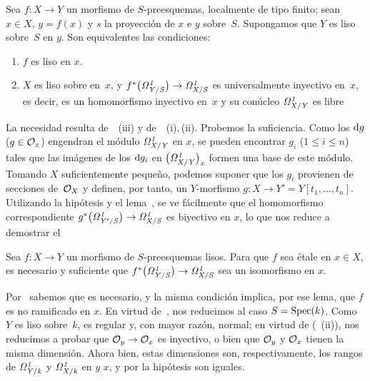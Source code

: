 \begin{corollaire}
\label{II.4.5}
Sea $f\colon X\to Y$ un morfismo de $S$-preesquemas, localmente de tipo finito; sean $x\in X$, $y=f(x)$ y $s$ la proyección de $x$ e $y$ sobre~$S$. Supongamos que $Y$ es liso sobre~$S$ en $y$. Son equivalentes las condiciones:
\begin{enumerate}
\item[(i)] $f$ es liso en $x$.
\item[(ii)] $X$ es liso sobre
en~$x$, y $f^*\big(\it{\Omega}^1_{Y/S}\big)\to\it{\Omega}^1_{X/S}$ es universalmente inyectivo en~$x$, es decir, es un homomorfismo inyectivo en~$x$ y su conúcleo $\it{\Omega}^1_{X/Y}$ es libre
\end{enumerate}
\end{corollaire}

La necesidad resulta de~~(iii) y de~~(i),\,(ii). Probemos la suficiencia. Como los $\rd g$ ($g\in\cal{O}_x$) engendran el módulo $\it{\Omega}^1_{X/Y}$ en $x$, se pueden encontrar
$g_i$ ($1\le i\le n$) tales que las imágenes de los $\rd g_i$ en $\big(\it{\Omega}^1_{X/Y}\big)_x$ formen una base de este módulo. Tomando $X$ suficientemente pequeño, podemos suponer que los $g_i$ provienen de secciones de~$\cal{O}_X$ y definen, por tanto, un $Y$-morfismo $g\colon X\to Y'=Y[t_1,\dots,t_n]$. Utilizando la hipótesis y el lema~, se ve fácilmente que el homomorfismo correspondiente $g^*\big(\it{\Omega}^1_{Y'/S}\big)\to\it{\Omega}^1_{X/S}$ es biyectivo en $x$, lo que nos reduce a demostrar el

\begin{corollaire}
\label{II.4.6}
Sea $f\colon X\to Y$ un morfismo de $S$-preesquemas lisos. Para que $f$ sea étale en $x\in X$, es necesario y suficiente que $f^*\big(\it{\Omega}^1_{Y/S}\big)\to\it{\Omega}^1_{X/S}$ sea un isomorfismo en $x$.
\end{corollaire}

Por~ sabemos que es necesario, y la misma condición implica, por ese lema, que $f$ es no ramificado en $x$. En virtud de~, nos reducimos al caso $S=\Spec(k)$. Como $Y$ es liso sobre~$k$, es regular y, con mayor razón, normal; en virtud de (~(ii)), nos reducimos a probar que $\cal{O}_y\to\cal{O}_x$ es inyectivo, o bien que $\cal{O}_y$ y $\cal{O}_x$ tienen la misma dimensión. Ahora bien, estas dimensiones son, respectivamente, los rangos de $\it{\Omega}^1_{Y/k}$ y $\it{\Omega}^1_{X/k}$ en $y$ \resp $x$, y por la hipótesis son iguales.

